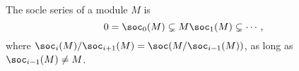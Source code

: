The socle series of a module $M$ is
\[ 0 = \soc_0(M) \subsetneq M \soc_1(M) \subsetneq \cdots, \]
where $\soc_i(M)/\soc_{i+1}(M) = \soc(M/\soc_{i-1}(M))$, as long as
$\soc_{i-1}(M)\neq M$.
